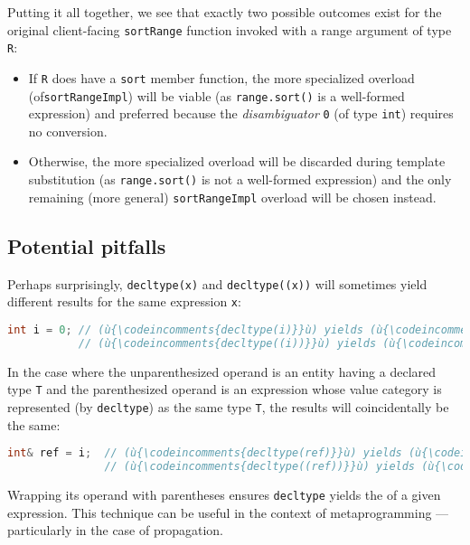 Putting it all together, we see that exactly two possible
outcomes exist for the original client-facing \lstinline!sortRange! function
invoked with a range argument of type \lstinline!R!:

\begin{itemize}
\item{If \lstinline!R! does have a \lstinline!sort! member function, the more specialized overload (of\linebreak[4] \lstinline!sortRangeImpl!) will be viable (as \lstinline!range.sort()! is a well-formed expression) and preferred because the \emph{disambiguator} \lstinline!0! (of type \lstinline!int!) requires no conversion.}
\item{Otherwise, the more specialized overload will be discarded during template substitution (as \lstinline!range.sort()! is not a well-formed expression) and the only remaining (more general) \lstinline!sortRangeImpl! overload will be chosen instead.}
\end{itemize}

\subsection[Potential pitfalls]{Potential pitfalls}\label{potential-pitfalls}

Perhaps surprisingly, \lstinline!decltype(x)! and \lstinline!decltype((x))!
will sometimes yield different results for the same expression
\lstinline!x!:

\begin{lstlisting}[language=C++]
int i = 0; // (ù{\codeincomments{decltype(i)}}ù) yields (ù{\codeincomments{int}}ù).
           // (ù{\codeincomments{decltype((i))}}ù) yields (ù{\codeincomments{int\&}}ù).
\end{lstlisting}

\noindent In the case where the unparenthesized operand is an entity having a
declared type \lstinline!T! and the parenthesized operand is an expression
whose value category is represented (by \lstinline!decltype!) as the same
type \lstinline!T!, the results will coincidentally be the same:

\begin{lstlisting}[language=C++]
int& ref = i;  // (ù{\codeincomments{decltype(ref)}}ù) yields (ù{\codeincomments{int\&}}ù).
               // (ù{\codeincomments{decltype((ref))}}ù) yields (ù{\codeincomments{int\&}}ù).
\end{lstlisting}

\noindent Wrapping its operand with parentheses ensures \lstinline!decltype! yields
the  of a given expression. This technique can be
useful in the context of metaprogramming --- particularly in the case of
 propagation.

